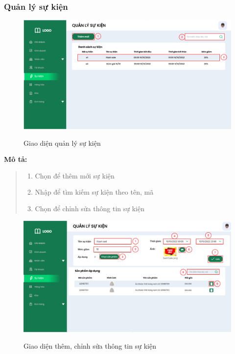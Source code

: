     \subsubsection{Quản lý sự kiện}
        \begin{figure}[!htp]
            \centering
            \includegraphics[width=12cm]{img/UI/admin/Event.png}
            \label{34}
            \newline
            \caption{Giao diện quản lý sự kiện}
        \end{figure}
        \textbf{Mô tả:}  
        \begin{quote}
            \begin{enumerate}
                \item Chọn để thêm mới sự kiện
                \item Nhập để tìm kiếm sự kiện theo tên, mã
                \item Chọn để chỉnh sửa thông tin sự kiện
            \end{enumerate}
        \end{quote}
            \begin{figure}[!htp]
                \centering
                \includegraphics[width=12cm]{img/UI/admin/Event_detail.png}
                \label{35}
                \newline
                \caption{Giao diện thêm, chỉnh sửa thông tin sự kiện}
            \end{figure}
